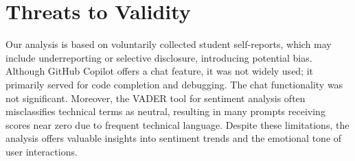 
\section{Threats to Validity}


Our analysis is based on voluntarily collected student self-reports, which may include underreporting or selective disclosure, introducing potential bias. Although GitHub Copilot offers a chat feature, it was not widely used; it primarily served for code completion and debugging. The chat functionality was not significant. Moreover, the VADER tool for sentiment analysis often misclassifies technical terms as neutral, resulting in many prompts receiving scores near zero due to frequent technical language. Despite these limitations, the analysis offers valuable insights into sentiment trends and the emotional tone of user interactions.





